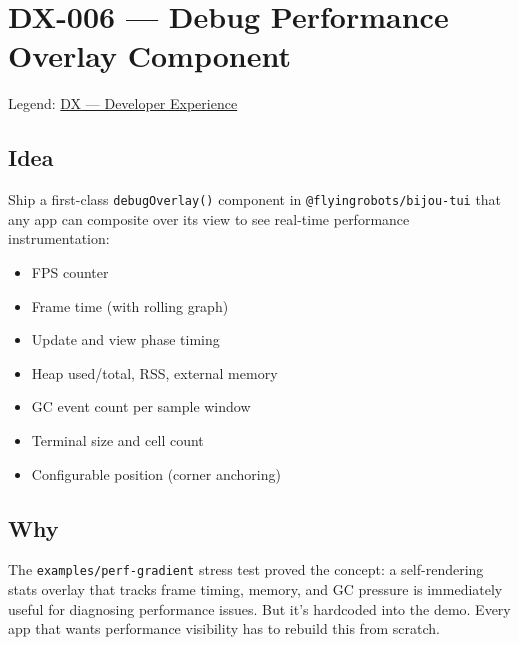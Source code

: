 \chapter{DX-006 --- Debug Performance Overlay Component}\label{record-305}

\smallskip

Legend: \href{https://github.com/flyingrobots/bijou/blob/cbd70612140e7a450d764b3c7be1c6af878b99bc/docs/method/graveyard/legends/DX-developer-experience.md}{DX --- Developer Experience}

\section{Idea}\label{record-305-idea}

Ship a first-class \texttt{d\allowbreak{}e\allowbreak{}b\allowbreak{}u\allowbreak{}g\allowbreak{}O\allowbreak{}v\allowbreak{}e\allowbreak{}r\allowbreak{}l\allowbreak{}a\allowbreak{}y\allowbreak{}(\allowbreak{})} component in \texttt{@\allowbreak{}f\allowbreak{}l\allowbreak{}y\allowbreak{}i\allowbreak{}n\allowbreak{}g\allowbreak{}r\allowbreak{}o\allowbreak{}b\allowbreak{}o\allowbreak{}t\allowbreak{}s\allowbreak{}/\allowbreak{}b\allowbreak{}i\allowbreak{}j\allowbreak{}o\allowbreak{}u\allowbreak{}-\allowbreak{}t\allowbreak{}u\allowbreak{}i} that any app can composite over its view to see real-time performance instrumentation:

\begin{itemize}
\tightlist
\item
  FPS counter
\item
  Frame time (with rolling graph)
\item
  Update and view phase timing
\item
  Heap used/total, RSS, external memory
\item
  GC event count per sample window
\item
  Terminal size and cell count
\item
  Configurable position (corner anchoring)
\end{itemize}

\section{Why}\label{record-305-why}

The \texttt{e\allowbreak{}x\allowbreak{}a\allowbreak{}m\allowbreak{}p\allowbreak{}l\allowbreak{}e\allowbreak{}s\allowbreak{}/\allowbreak{}p\allowbreak{}e\allowbreak{}r\allowbreak{}f\allowbreak{}-\allowbreak{}g\allowbreak{}r\allowbreak{}a\allowbreak{}d\allowbreak{}i\allowbreak{}e\allowbreak{}n\allowbreak{}t} stress test proved the concept: a self-rendering stats overlay that tracks frame timing, memory, and GC pressure is immediately useful for diagnosing performance issues. But it's hardcoded into the demo. Every app that wants performance visibility has to rebuild this from scratch.

